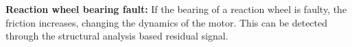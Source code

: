 \textbf{Reaction wheel bearing fault:}
If the bearing of a reaction wheel is faulty, the friction increases, changing the dynamics of the motor. This can be detected through the structural analysis based residual signal.


%
%


